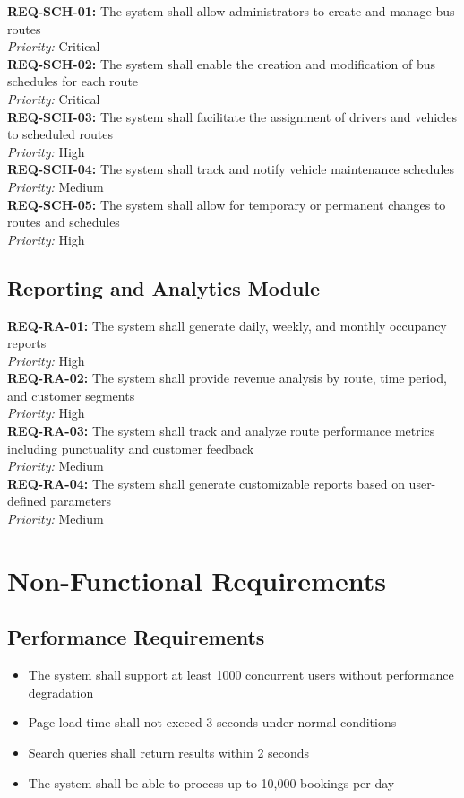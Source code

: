 \documentclass[12pt,a4paper]{report}
\newcommand{\requirement}[3]{
    \noindent\textbf{REQ-#1:} #2 \\
    \textit{Priority:} #3 \\
}
\begin{document}
\requirement{SCH-01}{The system shall allow administrators to create and manage bus routes}{Critical}

\requirement{SCH-02}{The system shall enable the creation and modification of bus schedules for each route}{Critical}

\requirement{SCH-03}{The system shall facilitate the assignment of drivers and vehicles to scheduled routes}{High}

\requirement{SCH-04}{The system shall track and notify vehicle maintenance schedules}{Medium}

\requirement{SCH-05}{The system shall allow for temporary or permanent changes to routes and schedules}{High}

\subsection{Reporting and Analytics Module}

\requirement{RA-01}{The system shall generate daily, weekly, and monthly occupancy reports}{High}

\requirement{RA-02}{The system shall provide revenue analysis by route, time period, and customer segments}{High}

\requirement{RA-03}{The system shall track and analyze route performance metrics including punctuality and customer feedback}{Medium}

\requirement{RA-04}{The system shall generate customizable reports based on user-defined parameters}{Medium}

\section{Non-Functional Requirements}

\subsection{Performance Requirements}
\begin{itemize}
    \item The system shall support at least 1000 concurrent users without performance degradation
    \item Page load time shall not exceed 3 seconds under normal conditions
    \item Search queries shall return results within 2 seconds
    \item The system shall be able to process up to 10,000 bookings per day
\end{itemize}
\end{document}
